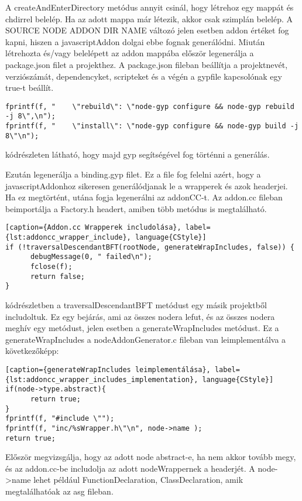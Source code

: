A createAndEnterDirectory metódus annyit csinál, hogy létrehoz egy mappát és chdirrel belelép. Ha az adott mappa már létezik, akkor csak szimplán belelép.
A SOURCE NODE ADDON DIR NAME változó jelen esetben addon értéket fog kapni, hiszen a javascriptAddon dolgai ebbe fognak generálódni.
Miután létrehozta és/vagy belelépett az addon mappába először legenerálja a package.json filet a projekthez.
A package.json fileban beállítja a projektnevét, verziószámát, dependencyket, scripteket és a végén a gypfile kapcsolónak egy true-t beállít.
\begin{lstlisting}[caption={NodeAddonGenerator package.json scripts}, label={lst:nodeAddonGenerator_package_json}, language={CStyle}]
fprintf(f, "    \"rebuild\": \"node-gyp configure && node-gyp rebuild -j 8\",\n");
fprintf(f, "    \"install\": \"node-gyp configure && node-gyp build -j 8\"\n");
\end{lstlisting}
 kódrészleten látható, hogy majd gyp segítségével fog történni a generálás.

\noindent

Ezután legenerálja a binding.gyp filet.
Ez a file fog felelni azért, hogy a javascriptAddonhoz sikeresen generálódjanak le a wrapperek és azok headerjei. Ha ez megtörtént, utána fogja legenerálni az addonCC-t.
Az addon.cc fileban beimportálja a Factory.h headert, amiben több metódus is megtalálható.
\begin{lstlisting}[caption={Addon.cc Wrapperek includolása}, label={lst:addoncc_wrapper_include}, language{CStyle}]
if (!traversalDescendantBFT(rootNode, generateWrapIncludes, false)) {
      debugMessage(0, " failed\n");
      fclose(f);
      return false;
}
\end{lstlisting}

 kódrészletben a traversalDescendantBFT metódust egy másik projektből includoltuk.
Ez egy bejárás, ami az összes nodera lefut, és az összes nodera meghív egy metódust, jelen esetben a generateWrapIncludes metódust.
Ez a generateWrapIncludes a nodeAddonGenerator.c fileban van leimplementálva a következőképp:
\begin{lstlisting}[caption={generateWrapIncludes leimplementálása}, label={lst:addoncc_wrapper_includes_implementation}, language{CStyle}]
if(node->type.abstract){
      return true;
}
fprintf(f, "#include \"");
fprintf(f, "inc/%sWrapper.h\"\n", node->name );
return true;
\end{lstlisting}
Először megvizsgálja, hogy az adott node abstract-e, ha nem akkor tovább megy, és az addon.cc-be includolja az adott nodeWrappernek a headerjét.
A node->name lehet például FunctionDeclaration, ClassDeclaration, amik megtalálhatóak az asg fileban.


